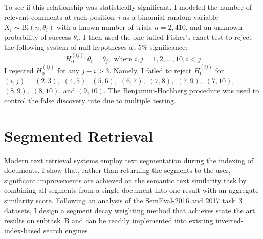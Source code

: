 \documentclass[
  digital, %
  notable, %
  lof,     %
  lot,     %
  nopalatino, color
]{fithesis3}
\begin{document}
To see if this relationship was statistically significant, I modeled the number
of relevant comments at each position~$i$ as a binomial random variable
$X_i\sim \mathrm{Bi}(n, \theta_i)$ with a known number of trials $n=2{,}410$,
and an unknown probability of success $\theta_i$. I then used the one-tailed
Fisher's exact test to reject the following system of null hypotheses at 5\%
significance:
\begin{equation*}
  H_0^{(ij)} : \theta_i = \theta_j,\text{ where }i, j = 1,2,\ldots,10, i < j
\end{equation*}
I rejected $H_0^{(ij)}$ for any $j-i > 3$. Namely, I failed to reject $H_0^{(ij)}$
for $(i,j) = (2,3),$ $(4,5),$ $(5,6),$ $(6,7),$ $(7,8),$ $(7,9),$ $(7,10),$
$(8, 9),$ $(8,10)$, and $(9,10)$. The Benjamini-Hochberg procedure was used to
control the false discovery rate due to multiple testing.

\chapter{Segmented Retrieval}
\label{chap:segmentation}
Modern text retrieval systems employ text segmentation during the indexing of documents.
I show that, rather than returning the segments to the user,
significant improvements are achieved on the semantic text
similarity task by combining all segments %
from a single document into one result with an aggregate similarity score. 
%
%
Following an analysis of the SemEval-2016 and 2017 task~3 datasets, I design a
segment decay weighting method that achieves state the art results on subtask~B
and can be readily implemented into existing inverted-index-based search
engines.
%
%
\end{document}
